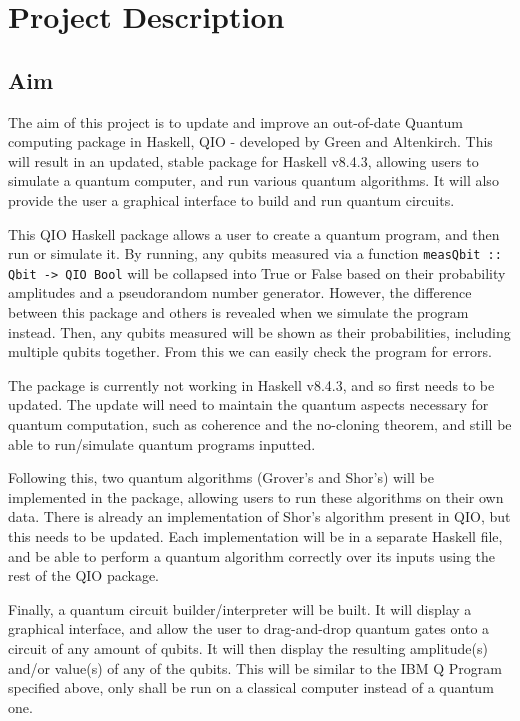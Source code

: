 \documentclass[a4paper,11pt, titlepage, twoside]{article}
\begin{document}
\section{Project Description}
\subsection{Aim}
The aim of this project is to update and improve an out-of-date Quantum computing package in Haskell, QIO - developed by Green and Altenkirch. This will result in an updated, stable package for Haskell v8.4.3, allowing users to simulate a quantum computer, and run various quantum algorithms. It will also provide the user a graphical interface to build and run quantum circuits. \par
This QIO Haskell package allows a user to create a quantum program, and then run or simulate it. By running, any qubits measured via a function \texttt{measQbit :: Qbit -> QIO Bool} will be collapsed into True or False based on their probability amplitudes and a pseudorandom number generator. However, the difference between this package and others is revealed when we simulate the program instead. Then, any qubits measured will be shown as their probabilities, including multiple qubits together. From this we can easily check the program for errors.\par
The package is currently not working in Haskell v8.4.3, and so first needs to be updated. The update will need to maintain the quantum aspects necessary for quantum computation, such as coherence and the no-cloning theorem, and still be able to run/simulate quantum programs inputted. \par
Following this, two quantum algorithms (Grover's and Shor's) will be implemented in the package, allowing users to run these algorithms on their own data. There is already an implementation of Shor's algorithm present in QIO, but this needs to be updated. Each implementation will be in a separate Haskell file, and be able to perform a quantum algorithm correctly over its inputs using the rest of the QIO package.\par
Finally, a quantum circuit builder/interpreter will be built. It will display a graphical interface, and allow the user to drag-and-drop quantum gates onto a circuit of any amount of qubits. It will then display the resulting amplitude(s) and/or value(s) of any of the qubits. This will be similar to the IBM Q Program specified above, only shall be run on a classical computer instead of a quantum one.
\end{document}
